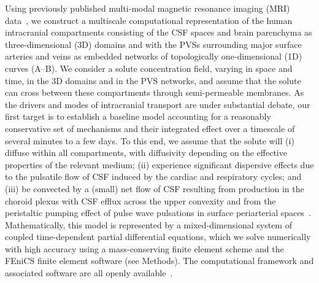 \documentclass[fleqn,10pt]{wlscirep}
\begin{document}
Using previously published multi-modal magnetic resonance imaging
(MRI) data~\cite{hodneland2019new, deistung2009tof,
  schweser2012quantitative, reichenbach2012future,
  deistung2017overview}, we construct a multiscale computational
representation of the human intracranial compartments consisting of
the CSF spaces and brain parenchyma as three-dimensional (3D) domains
and with the PVSs surrounding major surface arteries and veins as
embedded networks of topologically one-dimensional (1D) curves
(A--B). We consider a solute concentration field,
varying in space and time, in the 3D domains and in the PVS networks,
and assume that the solute can cross between these compartments
through semi-permeable membranes. As the drivers and modes of
intracranial transport are under substantial
debate\cite{smith2019going, proulx2021cerebrospinal,
  bohr2022glymphatic, hladky2022glymphatic, betsholtz2024advances},
our first target is to establish a baseline model accounting for a
reasonably conservative set of mechanisms and their integrated effect
over a timescale of several minutes to a few days. To this end, we
assume that the solute will (i) diffuse within all compartments, with
diffusivity depending on the effective properties of the relevant
medium\cite{sykova2008diffusion}; (ii) experience significant
dispersive effects due to the pulsatile flow of CSF induced by the
cardiac and respiratory cycles\cite{vinje2019respiratory,
  sharp2019dispersion, ray2021quantitative, troyetsky2021dispersion};
and (iii) be convected by a (small) net flow of CSF resulting from
production in the choroid plexus with CSF efflux across the upper
convexity\cite{hornkjol2022csf} and from the peristaltic pumping
effect of pulse wave pulsations in surface periarterial
spaces~\cite{mestre2018flow, gjerde2023directional}. Mathematically, this model is represented by a
mixed-dimensional system of coupled time-dependent partial
differential equations\cite{masri2024modelling}, which we solve
numerically with high accuracy using a mass-conserving finite element
scheme and the FEniCS finite element software\cite{alnaes2015fenics,
  kuchta2020assembly} (see Methods). The computational framework and
associated software are all openly available~\cite{ZENODO}.
\end{document}
